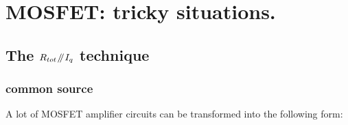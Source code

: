 \documentclass[11ypt]{extarticle}
\newcommand{\parallelEE}{\mathbin{\!/\mkern-5mu/\!}} %
\begin{document}
%
%

\section{MOSFET: tricky situations.}

\subsection{The $R_{tot} \parallelEE I_q$ technique}

\subsubsection{common source}
A lot of MOSFET amplifier circuits can be transformed into the following form:

\begin{figure}[H]{} 
    \centering
    
\end{figure}
\end{document}
